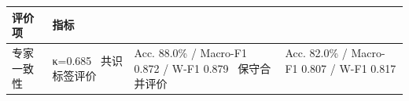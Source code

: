 \begin{tabular}{ll}
\toprule
评价项 & 指标 \\
\midrule
专家一致性 & κ=0.685 \
共识标签评价 & Acc. 88.0\% / Macro-F1 0.872 / W-F1 0.879 \
保守合并评价 & Acc. 82.0\% / Macro-F1 0.807 / W-F1 0.817 \
\bottomrule
\end{tabular}

